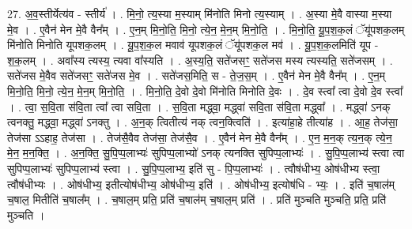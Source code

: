\documentclass[17pt]{extarticle}
\begin{document}
27. अ॒व॒स्तीर्येत्य॑व - स्तीर्य॑ । . मि॒नो॒ त्य॒स्या म॒स्याम् मि॑नोति मिनो त्य॒स्याम् । . अ॒स्या मे॒वै वास्या म॒स्या मे॒व । . ए॒वैन॑ मेन मे॒वै वैन᳚म् । . ए॒न॒म् मि॒नो॒ति॒ मि॒नो॒ त्ये॒न॒ मे॒न॒म् मि॒नो॒ति॒ । . मि॒नो॒ति॒ यू॒प॒श॒क॒लं ॅयू॑पशक॒लम् मि॑नोति मिनोति यूपशक॒लम् । . यू॒प॒श॒क॒ल मवाव॑ यूपशक॒लं ॅयू॑पशक॒ल मव॑ । . यू॒प॒श॒क॒लमिति॑ यूप - श॒क॒लम् । . अवा᳚स्य त्यस्य॒ त्यवा वा᳚स्यति । . अ॒स्य॒ति॒ सते॑जसꣳ॒॒ सते॑जस मस्य त्यस्यति॒ सते॑जसम् । . सते॑जस मे॒वैव सते॑जसꣳ॒॒ सते॑जस मे॒व । . सते॑जस॒मिति॒ स - ते॒ज॒स॒म् । . ए॒वैन॑ मेन मे॒वै वैन᳚म् । . ए॒न॒म् मि॒नो॒ति॒ मि॒नो॒ त्ये॒न॒ मे॒न॒म् मि॒नो॒ति॒ । . मि॒नो॒ति॒ दे॒वो दे॒वो मि॑नोति मिनोति दे॒वः । . दे॒व स्त्वा᳚ त्वा दे॒वो दे॒व स्त्वा᳚ । . त्वा॒ स॒वि॒ता स॑वि॒ता त्वा᳚ त्वा सवि॒ता । . स॒वि॒ता मद्ध्वा॒ मद्ध्वा॑ सवि॒ता स॑वि॒ता मद्ध्वा᳚ । . मद्ध्वा॑ ऽनक् त्वनक्तु॒ मद्ध्वा॒ मद्ध्वा॑ ऽनक्तु । . अ॒न॒क् त्वितीत्य॑ नक् त्वन॒क्त्विति॑ । . इत्या॑हा॒हे तीत्या॑ह । . आ॒ह॒ तेज॑सा॒ तेज॑सा ऽऽहाह॒ तेज॑सा । . तेज॑सै॒वैव तेज॑सा॒ तेज॑सै॒व । . ए॒वैन॑ मेन मे॒वै वैन᳚म् । . ए॒न॒ म॒न॒क् त्य॒न॒क् त्ये॒न॒ मे॒न॒ म॒न॒क्ति॒ । . अ॒न॒क्ति॒ सु॒पि॒प्प॒लाभ्यः॑ सुपिप्प॒लाभ्यो॑ ऽनक् त्यनक्ति सुपिप्प॒लाभ्यः॑ । . सु॒पि॒प्प॒लाभ्य॑ स्त्वा त्वा सुपिप्प॒लाभ्यः॑ सुपिप्प॒लाभ्य॑ स्त्वा । . सु॒पि॒प्प॒लाभ्य॒ इति॑ सु - पि॒प्प॒लाभ्यः॑ । . त्वौष॑धीभ्य॒ ओष॑धीभ्य स्त्वा॒ त्वौष॑धीभ्यः । . ओष॑धीभ्य॒ इतीत्योष॑धीभ्य॒ ओष॑धीभ्य॒ इति॑ । . ओष॑धीभ्य॒ इत्योष॑धि - भ्यः॒ । . इति॑ च॒षाल॑म् च॒षाल॒ मितीति॑ च॒षाल᳚म् । . च॒षाल॒म् प्रति॒ प्रति॑ च॒षाल॑म् च॒षाल॒म् प्रति॑ । . प्रति॑ मुञ्चति मुञ्चति॒ प्रति॒ प्रति॑ मुञ्चति । \newline
\end{document}
